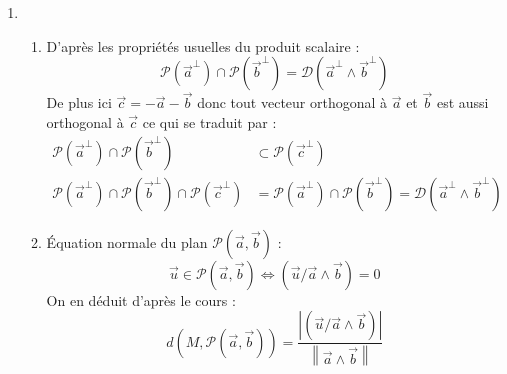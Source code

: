 \begin{enumerate}
 \item \begin{enumerate}
 \item D'après les propriétés usuelles du produit scalaire :
\begin{displaymath}
  \mathcal{P}(\overrightarrow{a}^\bot) \cap \mathcal{P}(\overrightarrow{b}^\bot) = 
\mathcal D (\overrightarrow{a}^\bot \wedge \overrightarrow{b}^\bot)
\end{displaymath}
De plus ici $\overrightarrow c = -\overrightarrow a - \overrightarrow b$ donc tout vecteur orthogonal à $\overrightarrow a$ et $\overrightarrow b$ est aussi orthogonal à $\overrightarrow c$ ce qui se traduit par :
\begin{align*}
 \mathcal{P}(\overrightarrow{a}^\bot) \cap \mathcal{P}(\overrightarrow{b}^\bot) &\subset \mathcal{P}(\overrightarrow{c}^\bot) \\
 \mathcal{P}(\overrightarrow{a}^\bot) \cap \mathcal{P}(\overrightarrow{b}^\bot) \cap \mathcal{P}(\overrightarrow{c}^\bot) &=  \mathcal{P}(\overrightarrow{a}^\bot) \cap \mathcal{P}(\overrightarrow{b}^\bot) 
= \mathcal D (\overrightarrow{a}^\bot \wedge \overrightarrow{b}^\bot)
\end{align*}

\item \'Equation normale du plan $\mathcal P (\overrightarrow a , \overrightarrow b)$ :
\begin{displaymath}
 \overrightarrow u \in \mathcal P (\overrightarrow a , \overrightarrow b) \Leftrightarrow
(\overrightarrow u / \overrightarrow a \wedge \overrightarrow b )= 0 
\end{displaymath}
On en déduit d'après le cours :
\begin{displaymath}
 d(M,\mathcal P (\overrightarrow a , \overrightarrow b)) =
 \frac
   {\left \vert (\overrightarrow u / \overrightarrow a \wedge \overrightarrow b ) \right \vert}
   {\left\|\overrightarrow a \wedge \overrightarrow b \right\|}
\end{displaymath}
\end{enumerate}


\end{enumerate}
